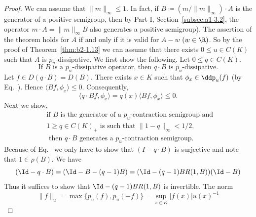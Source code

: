 \begin{proof}
We can assume that $\|m\|_{\infty} \leq 1$.
In fact, if\/ $B \coloneq (m/\|m\|_{\infty}) \cdot A$ is the generator of a positive semigroup, then by 
Part-I, Section~\ref{subsec:a1-3.2}, the operator $m \cdot A = \|m\|_{\infty}B$ also generates a positive semigroup).
The assertion of the theorem holds for $A$ if and only if it is valid for $A - w$ $(w \in \R)$.
So by the proof of Theorem~\ref{thm:b2-1.13} we can assume that there exists $0 \leq  u \in C(K)$ such that $A$ is $p_{u}$-dissipative.
We first show the following. Let $0 \leq  q \in C(K)$.
\begin{equation}\label{eq:b2-1.11}
\text{If } B \text{ is a } p_{u}\text{-dissipative operator, then } q \cdot B \text{ is } p_{u}\text{-dissipative.}
\end{equation}
Let $f \in D(q \cdot B) = D(B)$.
There exists $x \in K$ such that $\phi_{x} \in \ddp_{u}(f)$ (by Eq.~). 
Hence $\langle Bf,\phi_{x} \rangle \leq 0$.
Consequently, 
%
\[
	\langle q \cdot Bf,\phi_{x} \rangle = q(x)\langle Bf,\phi_{x} \rangle \leq 0 .
\]
%
Next we show,
\begin{equation}\label{eq:b2-1.12}
\begin{split}
&\text{if } B \text{ is the generator of a } p_{u}\text{-contraction semigroup and } \\
&1 \geq q \in C(K)_{+} \text{ is such that } \|1 - q\|_{\infty} < 1/2,  \\
&\text{ then } q \cdot B \text{ generates a } p_{u}\text{-contraction semigroup.}
\end{split}
\end{equation}
Because of Eq.~ we only have to show that 
$(I - q \cdot B)$ is surjective and note that $1 \in \rho(B)$.
We have 
\[
	( \Id - q \cdot B) = (\Id - B - (q-1)B) = (\Id - (q-1)BR(1,B))(\Id - B)
\]
Thus it suffices to show that $\Id - (q-1)BR(1,B)$ is invertible.
The norm 
\[
	\|f\|_{u} = \max\{p_{u}(f), p_{u}(-f) \} = \sup_{x \in K} |f(x)| u(x)^{-1}
\]
\end{proof}
